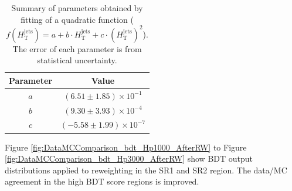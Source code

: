 \begin{table}[H]
  \centering
  \begin{tabular*}{60mm}{c|c}
    \hline\hline
    Parameter & Value\\
    \hline
    $a$ & $( 6.51{\pm}1.85)\times10^{-1}$ \\
    \hline
    $b$ & $( 9.30{\pm}3.93)\times10^{-4}$ \\
    \hline
    $c$ & $(-5.58{\pm}1.99)\times10^{-7}$ \\
    \hline\hline
  \end{tabular*}
  \caption{Summary of parameters obtained by fitting of a quadratic function ($f(H_{\text{T}}^{\text{jets}}) = a + b \cdot H_{\text{T}}^{\text{jets}} + c \cdot (H_{\text{T}}^{\text{jets}})^{2}$). The error of each parameter is from statistical uncertainty.}
  \label{tab:ParameterOfReweightingFunction}
\end{table}


Figure \ref{fig:DataMCComparison_bdt_Hp1000_AfterRW} to Figure \ref{fig:DataMCComparison_bdt_Hp3000_AfterRW} show BDT output distributions applied to reweighting in the SR1 and SR2 region. The data/MC agreement in the high BDT score regions is improved.

